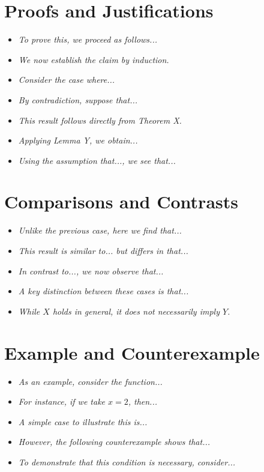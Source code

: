 \documentclass[10pt,letterpaper,oneside,reqno]{amsart}
\begin{document}
\begin{multicols}{2}
        \section*{Proofs and Justifications}
        \begin{itemize}
            \item \textit{To prove this, we proceed as follows...}
            \item \textit{We now establish the claim by induction.}
            \item \textit{Consider the case where...}
            \item \textit{By contradiction, suppose that...}
            \item \textit{This result follows directly from Theorem X.}
            \item \textit{Applying Lemma Y, we obtain...}
            \item \textit{Using the assumption that..., we see that...}
        \end{itemize}

        \columnbreak


        \section*{Comparisons and Contrasts}
        \begin{itemize}
            \item \textit{Unlike the previous case, here we find that...}
            \item \textit{This result is similar to... but differs in that...}
            \item \textit{In contrast to..., we now observe that...}
            \item \textit{A key distinction between these cases is that...}
            \item \textit{While \( X \) holds in general, it does not necessarily imply \( Y \).}
        \end{itemize}


        \section*{Example and Counterexample}
        \begin{itemize}
            \item \textit{As an example, consider the function...}
            \item \textit{For instance, if we take \( x = 2 \), then...}
            \item \textit{A simple case to illustrate this is...}
            \item \textit{However, the following counterexample shows that...}
            \item \textit{To demonstrate that this condition is necessary, consider...}
        \end{itemize}



\end{multicols}
\end{document}
